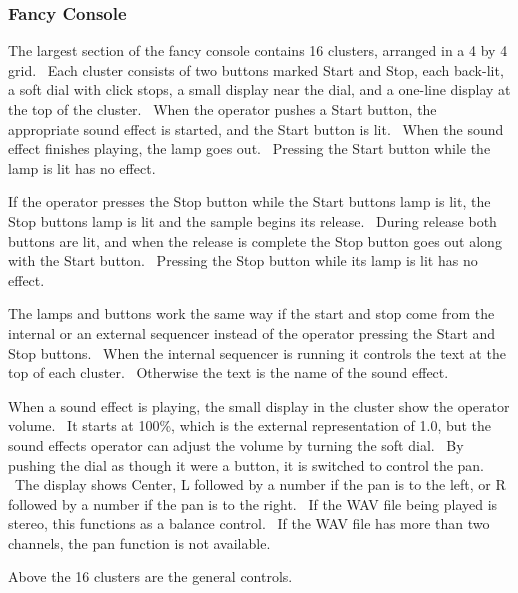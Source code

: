 \documentclass[letterpaper]{article}
\begin{document}
\subsubsection{Fancy Console}
The largest section of the fancy console contains 16 clusters, arranged
in a 4 by 4 grid. \ Each cluster consists of two buttons marked Start
and Stop, each back-lit, a soft dial with click stops, a small display
near the dial, and a one-line display at the top of the cluster. \ When
the operator pushes a Start button, the appropriate sound effect is
started, and the Start button is lit. \ When the sound effect finishes
playing, the lamp goes out. \ Pressing the Start button while the lamp
is lit has no effect.

If the operator presses the Stop button while the Start
button{\textquotesingle}s lamp is lit, the Stop
button{\textquotesingle}s lamp is lit and the sample begins its
release. \ During release both buttons are lit, and when the release is
complete the Stop button goes out along with the Start button.
\ Pressing the Stop button while its lamp is lit has no effect.

The lamps and buttons work the same way if the start and stop come from
the internal or an external sequencer instead of the operator pressing
the Start and Stop buttons. \ When the internal sequencer is running it
controls the text at the top of each cluster. \ Otherwise the text is
the name of the sound effect.

When a sound effect is playing, the small display in the cluster show
the operator volume. \ It starts at 100\%, which is the external
representation of 1.0, but the sound effects operator can adjust the
volume by turning the soft dial. \ By pushing the dial as though it
were a button, it is switched to control the pan. \ The display shows
Center, L followed by a number if the pan is to the left, or R followed
by a number if the pan is to the right. \ If the WAV file being played
is stereo, this functions as a balance control. \ If the WAV file has
more than two channels, the pan function is not available.

Above the 16 clusters are the general controls. \ 
\end{document}
